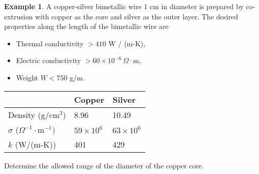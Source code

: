 \documentclass{article}
\theoremstyle{definition}
\newtheorem{example}[definition]{Example}
\begin{document}
\begin{example}
    A copper-silver bimetallic wire 1 cm in diameter is prepared by co-extrusion with copper as the core and silver as the outer layer. The desired properties along the length of the bimetallic wire are \vspace{1em}

    \begin{minipage}{0.55\textwidth}        
        \begin{itemize}
            \item Thermal conductivity $> 410$ W / (m-K),
            \item Electric conductivity $> 60 \times 10^{-6}\ \Omega \cdot$m,
            \item Weight $W < 750$ g/m.
        \end{itemize}
    \end{minipage}
    \hfill
    \begin{minipage}{0.45\textwidth}
        \begin{tabular}{p{3.45cm} p{1.25cm} p{1.25cm}}
            \toprule
            & Copper & Silver \\
            \midrule
            Density (g/cm$^3$) & 8.96 & 10.49 \\
            $\sigma$ ($\Omega^{-1} \cdot \text{m}^{-1})$ & $59 \times 10^6$ & $63 \times 10^6$ \\
            $k$ (W/(m-K)) & 401 & 429 \\
            \bottomrule
        \end{tabular}
    \end{minipage} \vspace{1em}

    Determine the allowed range of the diameter of the copper core.


\end{example}
\end{document}
